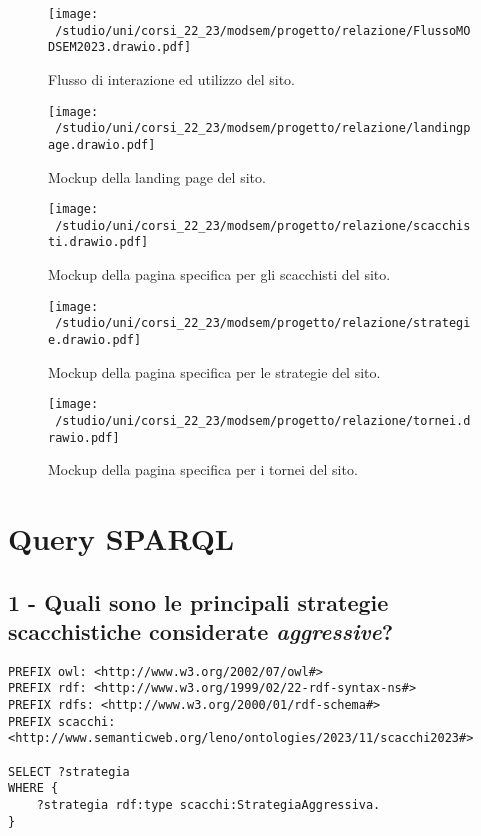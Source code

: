\documentclass[12pt]{book}
\begin{document}
\begin{figure}[h]
  \caption{Flusso di interazione ed utilizzo del sito.}
  \centering
  \label{fig:flusso}
  \texttt{[image: ~/studio/uni/corsi\_22\_23/modsem/progetto/relazione/FlussoMODSEM2023.drawio.pdf]}
\end{figure}

\begin{figure}[h]
  \caption{Mockup della landing page del sito.}
  \centering
  \label{fig:landing}
  \texttt{[image: ~/studio/uni/corsi\_22\_23/modsem/progetto/relazione/landingpage.drawio.pdf]}
\end{figure} 

\begin{figure}[h]
  \caption{Mockup della pagina specifica per gli scacchisti del sito.}
  \centering
\label{fig:scacchisti}
  \texttt{[image: ~/studio/uni/corsi\_22\_23/modsem/progetto/relazione/scacchisti.drawio.pdf]}
\end{figure} 

\begin{figure}[h]
  \caption{Mockup della pagina specifica per le strategie del sito.}
  \centering
\label{fig:strategie}
  \texttt{[image: ~/studio/uni/corsi\_22\_23/modsem/progetto/relazione/strategie.drawio.pdf]}
\end{figure} 


\begin{figure}[h]
  \caption{Mockup della pagina specifica per i tornei del sito.}
  \centering
\label{fig:tornei}
  \texttt{[image: ~/studio/uni/corsi\_22\_23/modsem/progetto/relazione/tornei.drawio.pdf]}
\end{figure} 

\chapter{Query SPARQL}

\section{1 - Quali sono le principali strategie scacchistiche considerate
\textit{aggressive}?}

\begin{verbatim}
PREFIX owl: <http://www.w3.org/2002/07/owl#>
PREFIX rdf: <http://www.w3.org/1999/02/22-rdf-syntax-ns#>
PREFIX rdfs: <http://www.w3.org/2000/01/rdf-schema#>
PREFIX scacchi: <http://www.semanticweb.org/leno/ontologies/2023/11/scacchi2023#>

SELECT ?strategia
WHERE {
    ?strategia rdf:type scacchi:StrategiaAggressiva.
}
\end{verbatim}
\end{document}
